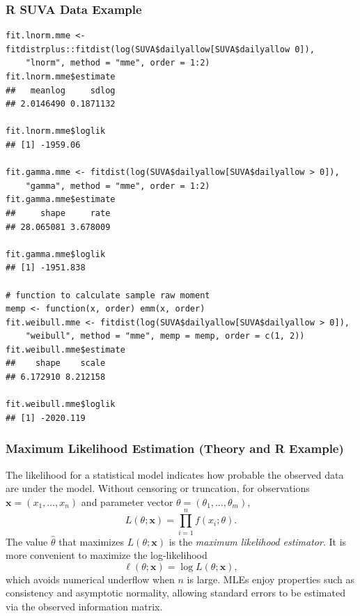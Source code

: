\documentclass[11pt]{article}
\newcommand{\noi}{\noindent}
\begin{document}
\subsubsection*{R SUVA Data Example}
\begin{lstlisting}
fit.lnorm.mme <- fitdistrplus::fitdist(log(SUVA$dailyallow[SUVA$dailyallow 0]),
    "lnorm", method = "mme", order = 1:2)
fit.lnorm.mme$estimate
##   meanlog     sdlog
## 2.0146490 0.1871132

fit.lnorm.mme$loglik
## [1] -1959.06

fit.gamma.mme <- fitdist(log(SUVA$dailyallow[SUVA$dailyallow > 0]),
    "gamma", method = "mme", order = 1:2)
fit.gamma.mme$estimate
##     shape     rate
## 28.065081 3.678009

fit.gamma.mme$loglik
## [1] -1951.838

# function to calculate sample raw moment
memp <- function(x, order) emm(x, order)
fit.weibull.mme <- fitdist(log(SUVA$dailyallow[SUVA$dailyallow > 0]),
    "weibull", method = "mme", memp = memp, order = c(1, 2))
fit.weibull.mme$estimate
##    shape    scale
## 6.172910 8.212158

fit.weibull.mme$loglik
## [1] -2020.119
\end{lstlisting}

\subsubsection{Maximum Likelihood Estimation (Theory and R Example)}
\noi The likelihood for a statistical model indicates how probable the observed data are under the model.  Without censoring or truncation, for observations \(\mathbf{x}=(x_1,\dots,x_n)\) and parameter vector \(\theta=(\theta_1,\dots,\theta_m)\),
\[
L(\theta;\mathbf{x})
= \prod_{i=1}^n f(x_i;\theta).
\]
The value \(\widehat\theta\) that maximizes \(L(\theta;\mathbf{x})\) is the \emph{maximum likelihood estimator}.  It is more convenient to maximize the log-likelihood
\[
\ell(\theta;\mathbf{x})
= \log L(\theta;\mathbf{x}),
\]
which avoids numerical underflow when \(n\) is large.  MLEs enjoy properties such as consistency and asymptotic normality, allowing standard errors to be estimated via the observed information matrix.
\end{document}
